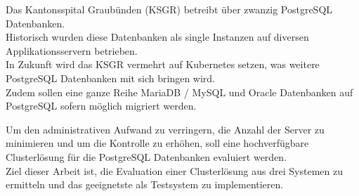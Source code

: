 \documentclass{ksgr_styles}
\begin{document}
    \begin{managementsummary}
        \begin{flushleft}
            Das Kantonsspital Graubünden (KSGR) betreibt über zwanzig PostgreSQL Datenbanken.\\
            Historisch wurden diese Datenbanken als single Instanzen auf diversen Applikationsservern betrieben.\\
            In Zukunft wird das KSGR vermehrt auf Kubernetes setzen, was weitere PostgreSQL Datenbanken mit sich bringen wird.\\
            Zudem sollen eine ganze Reihe MariaDB / MySQL und Oracle Datenbanken auf PostgreSQL sofern möglich migriert werden.
        \end{flushleft}
        \begin{flushleft}
            Um den administrativen Aufwand zu verringern, die Anzahl der Server zu minimieren und um die Kontrolle zu erhöhen, soll eine hochverfügbare Clusterlösung für die PostgreSQL Datenbanken evaluiert werden.\\
            Ziel dieser Arbeit ist, die Evaluation einer Clusterlösung aus drei Systemen zu ermitteln und das geeignetste als Testsystem zu implementieren.\\

\end{flushleft}
\end{managementsummary}
\end{document}
